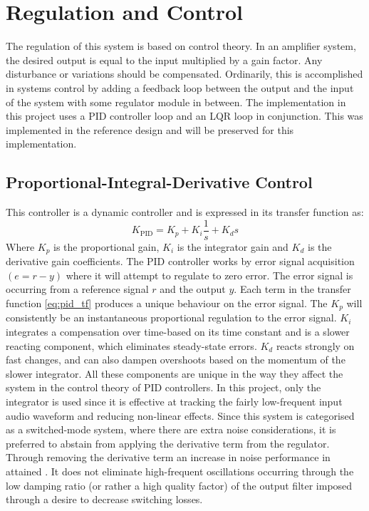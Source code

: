 \section{Regulation and Control}
The regulation of this system is based on control theory. In an amplifier system, the desired output is equal to the input multiplied by a gain factor. Any disturbance or variations should be compensated. Ordinarily, this is accomplished in systems control by adding a feedback loop between the output and the input of the system with some regulator module in between. The implementation in this project uses a PID controller loop and an LQR loop in conjunction. This was implemented in the reference design and will be preserved for this implementation.
\subsection{Proportional-Integral-Derivative Control}
This controller is a dynamic controller and is expressed in its transfer function as:
\begin{equation} \label{eq:pid_tf}
	K_{\mathrm{PID}} = K_{p} + K_{i} \frac{1}{s} + K_{d} s
\end{equation}
Where $K_{p}$ is the proportional gain, $K_{i}$ is the integrator gain and $K_{d}$ is the derivative gain coefficients. The PID controller works by error signal acquisition $(e = r - y)$ where it will attempt to regulate to zero error. The error signal is occurring from a reference signal $r$ and the output $y$.
Each term in the transfer function \autoref{eq:pid_tf} produces a unique behaviour on the error signal. The $K_{p}$ will consistently be an instantaneous proportional regulation to the error signal. $K_{i}$ integrates a compensation over time-based on its time constant and is a slower reacting component, which eliminates steady-state errors. $K_{d}$ reacts strongly on fast changes, and can also dampen overshoots based on the momentum of the slower integrator. All these components are unique in the way they affect the system in the control theory of PID controllers. In this project, only the integrator is used since it is effective at tracking the fairly low-frequent input audio waveform and reducing non-linear effects. Since this system is categorised as a switched-mode system, where there are extra noise considerations, it is preferred to abstain from applying the derivative term from the regulator. Through removing the derivative term an increase in noise performance in attained \cite{multivar_ctrl_loops_for_SM_audio_systems}. It does not eliminate high-frequent oscillations occurring through the low damping ratio (or rather a high quality factor) of the output filter imposed through a desire to decrease switching losses.


